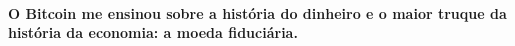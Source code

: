 \paragraph{O Bitcoin me ensinou sobre a história do dinheiro e o maior truque da história da economia: a moeda fiduciária.}

%
%
%
%

